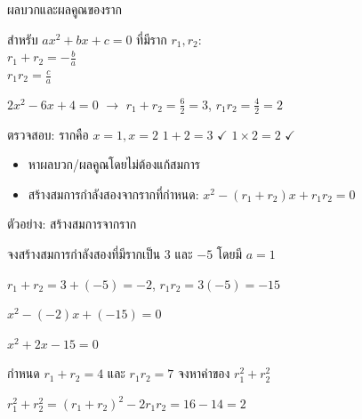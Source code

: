 \documentclass[11pt, aspectratio=169]{beamer}
\begin{document}
\begin{frame}{ผลบวกและผลคูณของราก}
  \begin{explanation}
    สำหรับ $ax^2 + bx + c = 0$ ที่มีราก $r_1, r_2$: \\
    $r_1 + r_2 = -\frac{b}{a}$ \\
    $r_1 r_2 = \frac{c}{a}$ 
  \end{explanation}

  \begin{exambox}[ตัวอย่าง]
    $2x^2 - 6x + 4 = 0$ \quad $\rightarrow$ \quad $r_1 + r_2 = \frac{6}{2} = 3$,
    \; $r_1 r_2 = \frac{4}{2} = 2$

    ตรวจสอบ: รากคือ $x=1, x=2$ \quad $1+2=3$ $\checkmark$ \quad $1\times2=2$ $\checkmark$
  \end{exambox}

  \begin{intuition}
    \begin{itemize}
      \item หาผลบวก/ผลคูณโดยไม่ต้องแก้สมการ
      \item สร้างสมการกำลังสองจากรากที่กำหนด:
      $x^2 - (r_1+r_2)x + r_1r_2 = 0$
    \end{itemize}
  \end{intuition}
\end{frame}

\begin{frame}{ตัวอย่าง: สร้างสมการจากราก}
  \begin{exambox}[โจทย์ 1]
    จงสร้างสมการกำลังสองที่มีรากเป็น $3$ และ $-5$ โดยมี $a=1$
  \end{exambox}

  \begin{solbox}
    $r_1 + r_2 = 3 + (-5) = -2$, \quad $r_1 r_2 = 3(-5) = -15$

    $x^2 - (-2)x + (-15) = 0$

    $x^2 + 2x - 15 = 0$
  \end{solbox}

  \begin{exambox}[โจทย์ 2]
    กำหนด $r_1 + r_2 = 4$ และ $r_1 r_2 = 7$ จงหาค่าของ $r_1^2 + r_2^2$
  \end{exambox}

  \begin{solbox}
    $r_1^2 + r_2^2 = (r_1+r_2)^2 - 2r_1r_2 = 16 - 14 = 2$
  \end{solbox}
\end{frame}

\end{document}
